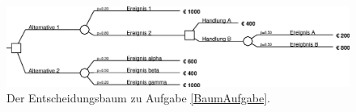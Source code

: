 \begin{figure}
\begin{center}
\includegraphics[width=22cm]{Grafiken/Klausur.eps}
\caption{Der Entscheidungsbaum zu Aufgabe \ref{BaumAufgabe}.}
\end{center}
\end{figure}
